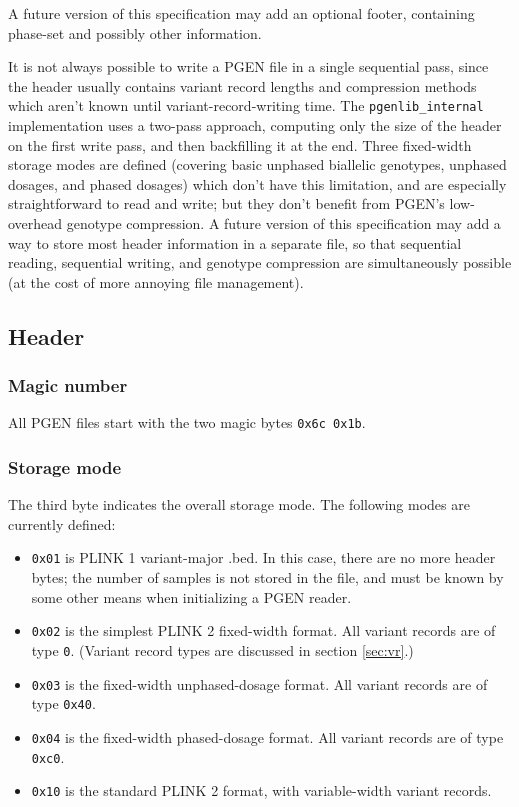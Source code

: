 \documentclass[8pt]{article}
\begin{document}
A future version of this specification may add an optional footer, containing
phase-set and possibly other information.

It is not always possible to write a PGEN file in a single sequential pass,
since the header usually contains variant record lengths and compression
methods which aren't known until variant-record-writing time.  The
\texttt{pgenlib\_internal} implementation uses a two-pass approach, computing
only the size of the header on the first write pass, and then backfilling it at
the end.  Three fixed-width storage modes are defined (covering basic unphased
biallelic genotypes, unphased dosages, and phased dosages) which don't have
this limitation, and are especially straightforward to read and write; but they
don't benefit from PGEN's low-overhead genotype compression.  A future version
of this specification may add a way to store most header information in a
separate file, so that sequential reading, sequential writing, and genotype
compression are simultaneously possible (at the cost of more annoying file
management).

\subsection{Header}

\subsubsection{Magic number}

All PGEN files start with the two magic bytes \texttt{0x6c 0x1b}.

\subsubsection{Storage mode}

The third byte indicates the overall storage mode.  The following modes are
currently defined:

\begin{itemize}
  \itemsep0em
\item \texttt{0x01} is PLINK 1 variant-major .bed.  In this case, there are no
  more header bytes; the number of samples is not stored in the file, and must
  be known by some other means when initializing a PGEN reader.
\item \texttt{0x02} is the simplest PLINK 2 fixed-width format.  All variant
  records are of type \texttt{0}.  (Variant record types are discussed in
  section \ref{sec:vr}.)
\item \texttt{0x03} is the fixed-width unphased-dosage format.  All variant
  records are of type \texttt{0x40}.
\item \texttt{0x04} is the fixed-width phased-dosage format.  All variant
  records are of type \texttt{0xc0}.
\item \texttt{0x10} is the standard PLINK 2 format, with variable-width variant
  records.
\end{itemize}
\end{document}
